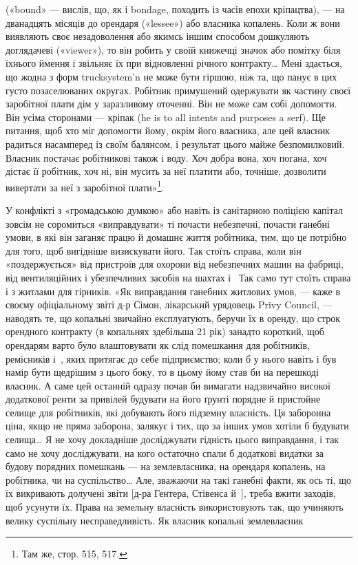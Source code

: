 \parcont{}  %
(«bound» — вислів, що, як і bondage, походить із часів епохи
кріпацтва), — на дванадцять місяців до орендаря («lessee») або
власника копалень. Коли ж вони виявляють своє незадоволення
або якимсь іншим способом дошкуляють доглядачеві («viewer»),
то він робить у своїй книжечці значок або помітку біля їхнього
ймення і звільняє їх при відновленні річного контракту\dots{} Мені
здається, що жодна з форм trucksystem’n не може бути гіршою,
ніж та, що панує в цих густо позаселюваних округах. Робітник
примушений одержувати як частину своєї заробітної плати дім
у заразливому оточенні. Він не може сам собі допомогти. Він
усіма сторонами — кріпак (he is to all intents and purposes a
serf). Ще питання, щоб хто міг допомогти йому, окрім його власника,
але цей власник радиться насамперед із своїм балянсом,
і результат цього майже безпомилковий. Власник постачає робітникові
також і воду. Хоч добра вона, хоч погана, хоч дістає
її робітник, хоч ні, він мусить за неї платити або, точніше, дозволити
вивертати за неї з заробітної плати»\footnote{
Там же, стор. 515, 517.
}.

У конфлікті з «громадською думкою» або навіть із санітарною
поліцією капітал зовсім не соромиться «виправдувати»
ті почасти небезпечні, почасти ганебні умови, в які він заганяє
працю й домашнє життя робітника, тим, що це потрібно для того,
щоб вигідніше визискувати його. Так стоїть справа, коли він
«поздержується» від пристроїв для охорони від небезпечних машин
на фабриці, від вентиляційних і убезпечливих засобів на шахтах
і~ Так само тут стоїть справа і з житлами для гірників. «Як
виправдання ганебних житлових умов, — каже в своєму офіціальному
звіті д-р Сімон, лікарський урядовець Privy Council, —
наводять те, що копальні звичайно експлуатують, беручи їх в
оренду, що строк орендного контракту (в копальнях здебільша
21 рік) занадто короткий, щоб орендарям варто було влаштовувати
як слід помешкання для робітників, ремісників і~,
яких притягає до себе підприємство; коли б у нього навіть і був
намір бути щедрішим з цього боку, то в цьому йому став би на
перешкоді власник. А саме цей останній одразу почав би вимагати
надзвичайно високої додаткової ренти за привілей будувати
на його ґрунті порядне й пристойне селище для робітників,
які добувають його підземну власність. Ця заборонна ціна, якщо
не пряма заборона, залякує і тих, що за інших умов хотіли б
будувати селища\dots{} Я не хочу докладніше досліджувати гідність
цього виправдання, і так само не хочу досліджувати, на кого
остаточно спали б додаткові видатки за будову порядних помешкань
— на землевласника, на орендаря копалень, на робітника,
чи на суспільство\dots{} Але, зважаючи на такі ганебні факти, як
ось ті, що їх викривають долучені звіти [д-ра Гентера, Стівенса
й~], треба вжити заходів, щоб усунути їх. Права
на земельну власність використовують так, що учиняють велику
суспільну несправедливість. Як власник копальні землевласник
\parbreak{}  %
